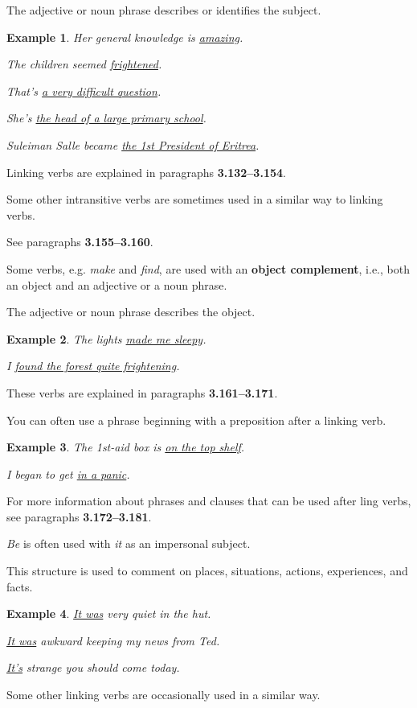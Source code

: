 \documentclass[oneside]{book}
\numberwithin{equation}{section}
\newtheorem{example}{Example}[section]
\begin{document}
The adjective or noun phrase describes or identifies the subject.
\begin{example}
    Her general knowledge is \underline{amazing}.
    
    The children seemed \underline{frightened}.
    
    That's \underline{a very difficult question}.
    
    She's \underline{the head of a large primary school}.
    
    Suleiman Salle became \underline{the 1st President of Eritrea}.
\end{example}
Linking verbs are explained in paragraphs \textbf{3.132--3.154}.

%
Some other intransitive verbs are sometimes used in a similar way to linking verbs.

See paragraphs \textbf{3.155--3.160}.

%
\noindent{} Some verbs, e.g. \textit{make} and \textit{find}, are used with an \textbf{object complement}, i.e., both an object and an adjective or a noun phrase.

The adjective or noun phrase describes the object.
\begin{example}
    The lights \underline{made me sleepy}.
    
    I \underline{found the forest quite frightening}.
\end{example}
These verbs are explained in paragraphs \textbf{3.161--3.171}.

%
\noindent{} You can often use a phrase beginning with a preposition after a linking verb.
\begin{example}
    The 1st-aid box is \underline{on the top shelf}.
    
    I began to get \underline{in a panic}.
\end{example}
For more information about phrases and clauses that can be used after ling verbs, see paragraphs \textbf{3.172--3.181}.

%
\noindent{} \textit{Be} is often used with \textit{it} as an impersonal subject.

This structure is used to comment on places, situations, actions, experiences, and facts.
\begin{example}
    \underline{It was} very quiet in the hut.
    
    \underline{It was} awkward keeping my news from Ted.
    
    \underline{It's} strange you should come today.
\end{example}
Some other linking verbs are occasionally used in a similar way.
\end{document}
